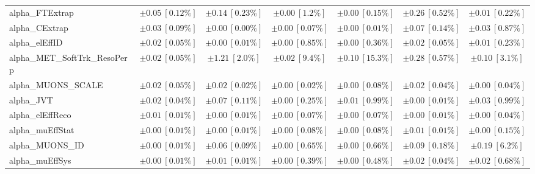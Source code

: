 \begin{sidewaystable}
\begin{center}
\begin{tabular*}{\textwidth}{@{\extracolsep{\fill}}lcccccc}
alpha\_FTExtrap         & $\pm 0.05\ [0.12\%] $          & $\pm 0.14\ [0.23\%] $          & $\pm 0.00\ [1.2\%] $          & $\pm 0.00\ [0.15\%] $          & $\pm 0.26\ [0.52\%] $          & $\pm 0.01\ [0.22\%] $       \\
alpha\_CExtrap         & $\pm 0.03\ [0.09\%] $          & $\pm 0.00\ [0.00\%] $          & $\pm 0.00\ [0.07\%] $          & $\pm 0.00\ [0.01\%] $          & $\pm 0.07\ [0.14\%] $          & $\pm 0.03\ [0.87\%] $       \\
alpha\_elEffID         & $\pm 0.02\ [0.05\%] $          & $\pm 0.00\ [0.01\%] $          & $\pm 0.00\ [0.85\%] $          & $\pm 0.00\ [0.36\%] $          & $\pm 0.02\ [0.05\%] $          & $\pm 0.01\ [0.23\%] $       \\
alpha\_MET\_SoftTrk\_ResoPerp         & $\pm 0.02\ [0.05\%] $          & $\pm 1.21\ [2.0\%] $          & $\pm 0.02\ [9.4\%] $          & $\pm 0.10\ [15.3\%] $          & $\pm 0.28\ [0.57\%] $          & $\pm 0.10\ [3.1\%] $       \\
alpha\_MUONS\_SCALE         & $\pm 0.02\ [0.05\%] $          & $\pm 0.02\ [0.02\%] $          & $\pm 0.00\ [0.02\%] $          & $\pm 0.00\ [0.08\%] $          & $\pm 0.02\ [0.04\%] $          & $\pm 0.00\ [0.04\%] $       \\
alpha\_JVT         & $\pm 0.02\ [0.04\%] $          & $\pm 0.07\ [0.11\%] $          & $\pm 0.00\ [0.25\%] $          & $\pm 0.01\ [0.99\%] $          & $\pm 0.00\ [0.01\%] $          & $\pm 0.03\ [0.99\%] $       \\
alpha\_elEffReco         & $\pm 0.01\ [0.01\%] $          & $\pm 0.00\ [0.01\%] $          & $\pm 0.00\ [0.07\%] $          & $\pm 0.00\ [0.07\%] $          & $\pm 0.00\ [0.01\%] $          & $\pm 0.00\ [0.04\%] $       \\
alpha\_muEffStat         & $\pm 0.00\ [0.01\%] $          & $\pm 0.00\ [0.01\%] $          & $\pm 0.00\ [0.08\%] $          & $\pm 0.00\ [0.08\%] $          & $\pm 0.01\ [0.01\%] $          & $\pm 0.00\ [0.15\%] $       \\
alpha\_MUONS\_ID         & $\pm 0.00\ [0.01\%] $          & $\pm 0.06\ [0.09\%] $          & $\pm 0.00\ [0.65\%] $          & $\pm 0.00\ [0.66\%] $          & $\pm 0.09\ [0.18\%] $          & $\pm 0.19\ [6.2\%] $       \\
alpha\_muEffSys         & $\pm 0.00\ [0.01\%] $          & $\pm 0.01\ [0.01\%] $          & $\pm 0.00\ [0.39\%] $          & $\pm 0.00\ [0.48\%] $          & $\pm 0.02\ [0.04\%] $          & $\pm 0.02\ [0.68\%] $       \\

\end{tabular*}
\end{center}
\end{sidewaystable}
